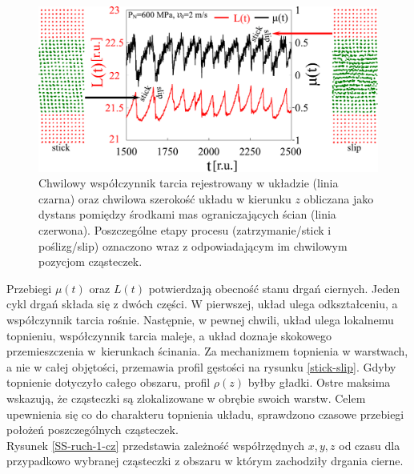 \documentclass[12pt,a4paper,openright]{report} %
\begin{document}
\begin{figure}
\centering
\includegraphics[width=160mm]{rysunki/PRE16_fig5.pdf}
\caption{Chwilowy współczynnik tarcia rejestrowany w układzie (linia czarna) oraz chwilowa szerokość układu w kierunku $z$ obliczana jako dystans pomiędzy środkami mas ograniczających ścian (linia czerwona). Poszczególne etapy procesu (zatrzymanie/stick i poślizg/slip) oznaczono wraz z odpowiadającym im chwilowym pozycjom cząsteczek.}
\label{st-sl-state}
\end{figure}
Przebiegi $\mu(t)$ oraz $L(t)$ potwierdzają obecność stanu drgań ciernych. Jeden cykl drgań składa się z dwóch części. W pierwszej, układ ulega odkształceniu, a współczynnik tarcia rośnie. Następnie, w pewnej chwili, układ ulega lokalnemu topnieniu, współczynnik tarcia maleje, a układ doznaje skokowego przemieszczenia w~kierunkach ścinania. Za mechanizmem topnienia w warstwach, a nie w całej objętości, przemawia profil gęstości na rysunku \ref{stick-slip}. Gdyby topnienie dotyczyło całego obszaru, profil $\rho(z)$ byłby gładki. Ostre maksima wskazują, że cząsteczki są zlokalizowane w obrębie swoich warstw. Celem upewnienia się co do charakteru topnienia układu, sprawdzono czasowe przebiegi położeń poszczególnych cząsteczek. \\Rysunek \ref{SS-ruch-1-cz} przedstawia zależność współrzędnych $x, y, z$ od czasu dla przypadkowo wybranej cząsteczki z obszaru w którym zachodziły drgania cierne.
%
\end{document}
